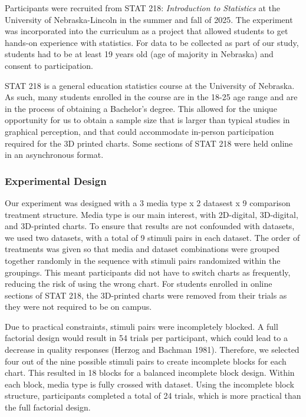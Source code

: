 \documentclass[
  letterpaper,
  DIV=11,
  numbers=noendperiod]{scrartcl}
\begin{document}
Participants were recruited from STAT 218: \emph{Introduction to
Statistics} at the University of Nebraska-Lincoln in the summer and fall
of 2025. The experiment was incorporated into the curriculum as a
project that allowed students to get hands-on experience with
statistics. For data to be collected as part of our study, students had
to be at least 19 years old (age of majority in Nebraska) and consent to
participation.

STAT 218 is a general education statistics course at the University of
Nebraska. As such, many students enrolled in the course are in the 18-25
age range and are in the process of obtaining a Bachelor's degree. This
allowed for the unique opportunity for us to obtain a sample size that
is larger than typical studies in graphical perception, and that could
accommodate in-person participation required for the 3D printed charts.
Some sections of STAT 218 were held online in an asynchronous format.

\subsubsection{Experimental Design}\label{experimental-design}

Our experiment was designed with a 3 media type x 2 datasest x 9
comparison treatment structure. Media type is our main interest, with
2D-digital, 3D-digital, and 3D-printed charts. To ensure that results
are not confounded with datasets, we used two datasets, with a total of
9 stimuli pairs in each dataset. The order of treatments was given so
that media and dataset combinations were grouped together randomly in
the sequence with stimuli pairs randomized within the groupings. This
meant participants did not have to switch charts as frequently, reducing
the risk of using the wrong chart. For students enrolled in online
sections of STAT 218, the 3D-printed charts were removed from their
trials as they were not required to be on campus.

Due to practical constraints, stimuli pairs were incompletely blocked. A
full factorial design would result in 54 trials per participant, which
could lead to a decrease in quality responses (Herzog and Bachman 1981).
Therefore, we selected four out of the nine possible stimuli pairs to
create incomplete blocks for each chart. This resulted in 18 blocks for
a balanced incomplete block design. Within each block, media type is
fully crossed with dataset. Using the incomplete block structure,
participants completed a total of 24 trials, which is more practical
than the full factorial design.
\end{document}
